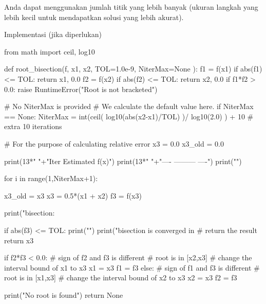 Anda dapat menggunakan jumlah titik yang lebih banyak (ukuran langkah yang lebih
kecil untuk mendapatkan solusi yang lebih akurat).

Implementasi  (jika diperlukan)
\begin{pythoncode}
from math import ceil, log10

def root_bisection(f, x1, x2, TOL=1.0e-9, NiterMax=None ):
    f1 = f(x1)
    if abs(f1) <= TOL:
        return x1, 0.0
    f2 = f(x2)
    if abs(f2) <= TOL:
        return x2, 0.0
    if f1*f2 > 0.0:
        raise RuntimeError("Root is not bracketed")

    # No NiterMax is provided
    # We calculate the default value here.
    if NiterMax == None:
        NiterMax = int(ceil( log10(abs(x2-x1)/TOL) )/ log10(2.0) ) + 10
        # extra 10 iterations

    # For the purpose of calculating relative error
    x3 = 0.0
    x3_old = 0.0

    print(13*" "+"Iter      Estimated          f(x)")
    print(13*" "+"----      ---------          ----")
    print("")

    for i in range(1,NiterMax+1):

        x3_old = x3
        x3 = 0.5*(x1 + x2)
        f3 = f(x3)

        print("bisection: %

        if abs(f3) <= TOL:
            print("")
            print("bisection is converged in %
            # return the result
            return x3

        if f2*f3 < 0.0:
            # sign of f2 and f3 is different
            # root is in [x2,x3]
            # change the interval bound of x1 to x3
            x1 = x3
            f1 = f3
        else:
            # sign of f1 and f3 is different
            # root is in [x1,x3]
            # change the interval bound of x2 to x3
            x2 = x3
            f2 = f3

    print("No root is found")
    return None
\end{pythoncode}
